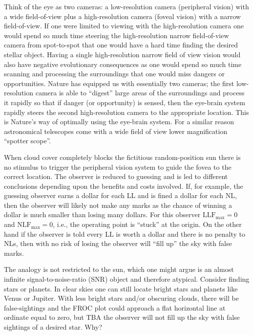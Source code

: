 \documentclass[
]{book}
\begin{document}
Think of the eye as two cameras: a low-resolution camera (peripheral vision) with a wide field-of-view plus a high-resolution camera (foveal vision) with a narrow field-of-view. If one were limited to viewing with the high-resolution camera one would spend so much time steering the high-resolution narrow field-of-view camera from spot-to-spot that one would have a hard time finding the desired stellar object. Having a single high-resolution narrow field of view vision would also have negative evolutionary consequences as one would spend so much time scanning and processing the surroundings that one would miss dangers or opportunities. Nature has equipped us with essentially two cameras; the first low-resolution camera is able to ``digest'' large areas of the surroundings and process it rapidly so that if danger (or opportunity) is sensed, then the eye-brain system rapidly steers the second high-resolution camera to the appropriate location. This is Nature's way of optimally using the eye-brain system. For a similar reason astronomical telescopes come with a wide field of view lower magnification ``spotter scope''.

When cloud cover completely blocks the fictitious random-position sun there is no stimulus to trigger the peripheral vision system to guide the fovea to the correct location. The observer is reduced to guessing and is led to different conclusions depending upon the benefits and costs involved. If, for example, the guessing observer earns a dollar for each LL and is fined a dollar for each NL, then the observer will likely not make any marks as the chance of winning a dollar is much smaller than losing many dollars. For this observer \(\text{LLF}_{\text{max}} = 0\) and \(\text{NLF}_{\text{max}} = 0\), i.e., the operating point is ``stuck'' at the origin. On the other hand if the observer is told every LL is worth a dollar and there is no penalty to NLs, then with no risk of losing the observer will ``fill up'' the sky with false marks.

The analogy is not restricted to the sun, which one might argue is an almost infinite signal-to-noise-ratio (SNR) object and therefore atypical. Consider finding stars or planets. In clear skies one can still locate bright stars and planets like Venus or Jupiter. With less bright stars and/or obscuring clouds, there will be false-sightings and the FROC plot could approach a flat horizontal line at ordinate equal to zero, but TBA the observer will not fill up the sky with false sightings of a desired star. Why?
\end{document}
